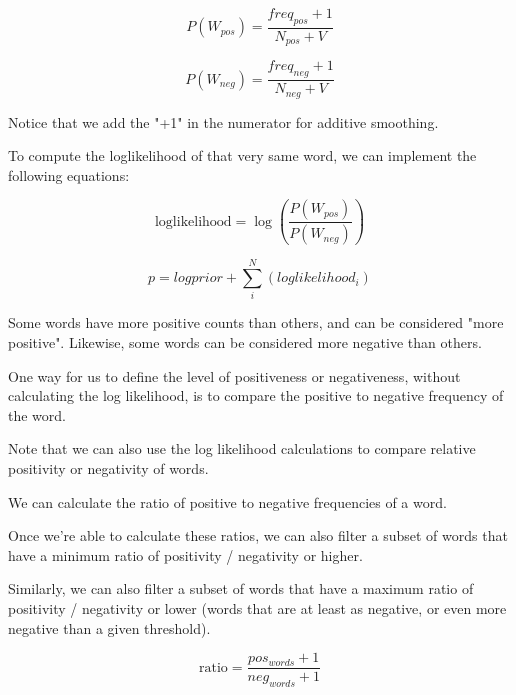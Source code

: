 \documentclass[4apaper,12pt]{book}
\begin{document}
\begin{description}
\item $$ P(W_{pos}) = \frac{freq_{pos} + 1}{N_{pos} + V}$$
\item $$ P(W_{neg}) = \frac{freq_{neg} + 1}{N_{neg} + V}$$

\item Notice that we add the "+1" in the numerator for additive smoothing.

\item To compute the loglikelihood of that very same word, we can implement the following equations:

\item $$\text{loglikelihood} = \log \left(\frac{P(W_{pos})}{P(W_{neg})} \right)$$

\item $$ p = logprior + \sum_i^N (loglikelihood_i)$$

\item Some words have more positive counts than others, and can be considered "more positive".  Likewise, some words can be considered more negative than others.
\item One way for us to define the level of positiveness or negativeness, without calculating the log likelihood, is to compare the positive to negative frequency of the word.
\item Note that we can also use the log likelihood calculations to compare relative positivity or negativity of words.
\item We can calculate the ratio of positive to negative frequencies of a word.
\item Once we're able to calculate these ratios, we can also filter a subset of words that have a minimum ratio of positivity / negativity or higher.
\item Similarly, we can also filter a subset of words that have a maximum ratio of positivity / negativity or lower (words that are at least as negative, or even more negative than a given threshold).

\item $$ \text{ratio} = \frac{pos_{words} + 1}{neg_{words} + 1} $$


\end{description}
\end{document}
